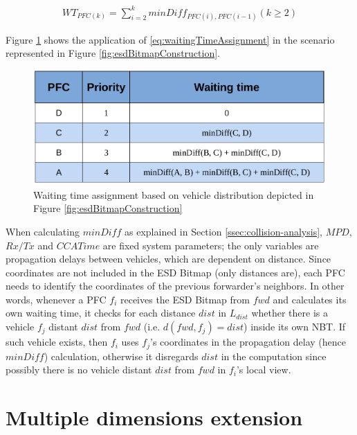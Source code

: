 			\begin{gather}
				WT_{PFC(k)} = \sum_{i=2}^{k} minDiff_{PFC(i),PFC(i-1)} (k \geq 2)
				\label{eq:waitingTimeAssignment}
			\end{gather}
			
			Figure \ref{fig:waitingTimeAssignment} shows the application of \ref{eq:waitingTimeAssignment} in the scenario represented in Figure \ref{fig:esdBitmapConstruction}.
			
			\begin{figure}[H]
				\centering
				\includegraphics[width=\textwidth]{immagini/waitingTimeAssignment}
				\caption{Waiting time assignment based on vehicle distribution depicted in Figure \ref{fig:esdBitmapConstruction}}
				\label{fig:waitingTimeAssignment}
			\end{figure}
			
			When calculating $minDiff$ as explained in Section \ref{ssec:collision-analysis}, $MPD$, $Rx/Tx$ and $CCATime$ are fixed system parameters; the only variables are propagation delays between vehicles, which are dependent on distance. Since coordinates are not included in the ESD Bitmap (only distances are), each PFC needs to identify the coordinates of the previous forwarder's neighbors. In other words, whenever a PFC $f_i$ receives the ESD Bitmap from $fwd$ and calculates its own waiting time, it checks for each distance $dist$ in $L_{dist}$ whether there is a vehicle $f_j$ distant $dist$ from $fwd$ (i.e. $d(fwd, f_j) = dist$) inside its own NBT. If such vehicle exists, then $f_i$ uses $f_j$'s coordinates in the propagation delay (hence $minDiff$) calculation, otherwise it disregards $dist$ in the computation since possibly there is no vehicle distant $dist$ from $fwd$ in $f_i$'s local view.
			
	\section{Multiple dimensions extension}
		
